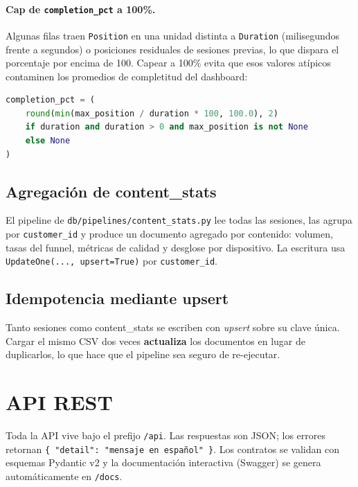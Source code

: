 \documentclass[12pt, letterpaper]{article}
\newcommand{\code}[1]{\texttt{#1}}
\begin{document}
\paragraph{Cap de \code{completion\_pct} a 100\%.} Algunas filas traen
\code{Position} en una unidad distinta a \code{Duration} (milisegundos frente a
segundos) o posiciones residuales de sesiones previas, lo que dispara el
porcentaje por encima de 100. Capear a 100\% evita que esos valores atípicos
contaminen los promedios de completitud del dashboard:

\begin{lstlisting}[language=Python,caption={Cálculo de completitud capado}]
completion_pct = (
    round(min(max_position / duration * 100, 100.0), 2)
    if duration and duration > 0 and max_position is not None
    else None
)
\end{lstlisting}

\subsection{Agregación de content\_stats}
El pipeline de \code{db/pipelines/content\_stats.py} lee todas las sesiones, las
agrupa por \code{customer\_id} y produce un documento agregado por contenido:
volumen, tasas del funnel, métricas de calidad y desglose por dispositivo. La
escritura usa \code{UpdateOne(..., upsert=True)} por \code{customer\_id}.

\subsection{Idempotencia mediante upsert}
Tanto sesiones como content\_stats se escriben con \emph{upsert} sobre su clave
única. Cargar el mismo CSV dos veces \textbf{actualiza} los documentos en lugar
de duplicarlos, lo que hace que el pipeline sea seguro de re-ejecutar.

\section{API REST}
Toda la API vive bajo el prefijo \code{/api}. Las respuestas son JSON; los
errores retornan \code{\{ "detail": "mensaje en español" \}}. Los contratos se
validan con esquemas Pydantic v2 y la documentación interactiva (Swagger) se
genera automáticamente en \code{/docs}.
\end{document}
